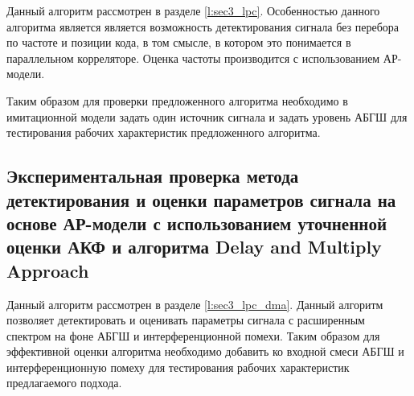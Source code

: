 Данный алгоритм рассмотрен в разделе \ref{l:sec3_lpc}. Особенностью данного алгоритма является является возможность детектирования сигнала
без перебора по частоте и позиции кода, в том смысле, в котором это понимается в параллельном корреляторе. Оценка частоты производится с
использованием АР-модели.

Таким образом для проверки предложенного алгоритма необходимо в имитационной модели задать один источник сигнала и задать уровень АБГШ для
тестирования рабочих характеристик предложенного алгоритма.

\subsection{Экспериментальная проверка метода детектирования и оценки параметров сигнала на основе АР-модели с использованием уточненной оценки АКФ
	и алгоритма Delay and Multiply Approach}

Данный алгоритм рассмотрен в разделе \ref{l:sec3_lpc_dma}. Данный алгоритм позволяет детектировать и оценивать параметры сигнала с расширенным спектром
на фоне АБГШ и интерференционной помехи. Таким образом для эффективной оценки алгоритма необходимо добавить ко входной смеси АБГШ и интерференционную помеху
для тестирования рабочих характеристик предлагаемого подхода.
